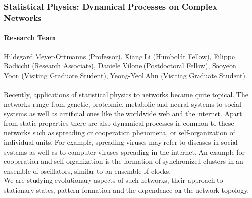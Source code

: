 \subsubsection{Statistical Physics: Dynamical Processes on Complex
Networks} 

\paragraph{Research Team} Hildegard Meyer-Ortmanns (Professor), Xiang Li (Humboldt Fellow),
Filippo Radicchi (Research Associate), Daniele Vilone
(Postdoctoral Fellow), Sooyeon Yoon (Visiting Graduate Student), Yeong-Yeol Ahn (Visiting Graduate Student)\\
\\
Recently, applications of statistical physics to networks became
quite topical. The networks range from genetic, proteomic,
metabolic and neural systems to social systems as well as
artificial ones like the worldwide web and the internet. Apart
from static properties there are also dynamical processes in
common to these networks such as spreading or cooperation
phenomena, or self-organization of individual units. For example,
spreading viruses may refer to diseases in social systems as well
as to computer viruses spreading in the internet. An example for
cooperation and self-organization is the formation of synchronized
clusters in an ensemble of oscillators, similar to an ensemble of
clocks.
\\
We are studying evolutionary aspects of such networks, their
approach to stationary states, pattern formation and the
dependence on the network topology.



